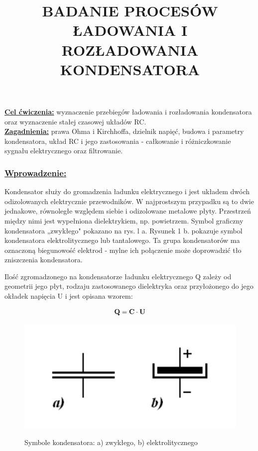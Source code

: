 \documentclass{article}
\title{BADANIE PROCESÓW ŁADOWANIA I ROZŁADOWANIA KONDENSATORA}
\begin{document}
\maketitle

\textbf{\underline{Cel ćwiczenia:}} wyznaczenie przebiegów ładowania i rozładowania kondensatora oraz
wyznaczenie stałej czasowej układów RC.
\\
\textbf{\underline{Zagadnienia:}} prawa Ohma i Kirchhoffa, dzielnik napięć, budowa i parametry kondensatora,
układ RC i jego zastosowania - całkowanie i różniczkowanie sygnału elektrycznego oraz filtrowanie.%

\subsubsection*{\textbf{\underline{Wprowadzenie:}}}

Kondensator służy do gromadzenia ładunku elektrycznego i jest układem dwóch odizolowanych elektrycznie przewodników. W najprostszym przypadku są to dwie jednakowe, równoległe względem siebie i odizolowane metalowe płyty. Przestrzeń między nimi jest wypełniona dielektrykiem, np. powietrzem. Symbol graficzny kondensatora „zwykłego" pokazano na rys. l a. Rysunek 1 b. pokazuje symbol kondensatora elektrolitycznego lub tantalowego. Ta grupa kondensatorów ma oznaczoną biegunowość elektrod - mylne ich połączenie może doprowadzić tło zniszczenia kondensatora. %

Ilość zgromadzonego na kondensatorze ładunku elektrycznego Q zależy od geometrii jego płyt, rodzaju zastosowanego dielektryka oraz przyłożonego do jego okładek napięcia U i jest opisana wzorem:

\begin{equation}
    \centering%
    \label{eq:intro}
    \mathbf{Q = C \cdot U}
\end{equation}

\begin{figure}[H]
    \centering
    \includegraphics[width=0.5\linewidth]{capacitor_fig_1.png}%
    \label{fig:capacitor_fig}
    \caption{Symbole kondensatora: a) zwykłego, b) elektrolitycznego}
    \end{figure}
\end{document}
